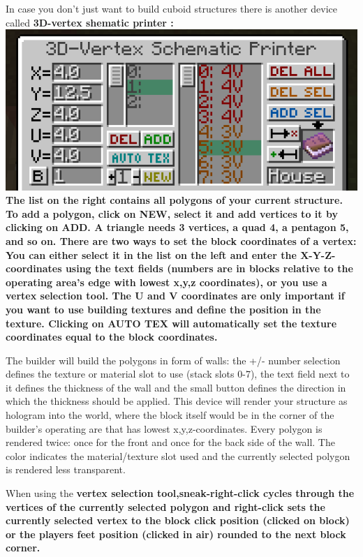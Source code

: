 \documentclass[11pt]{article} %
\begin{document}
In case you don't just want to build cuboid structures there is another device called \bf 3D-vertex shematic printer \rm :\\
\includegraphics[width = \textwidth]{vertexPrinter} \\
The list on the right contains all polygons of your current structure. To add a polygon, click on \bf NEW\rm, select it and add vertices to it by clicking on \bf ADD\rm . A triangle needs 3 vertices, a quad 4, a pentagon 5, and so on. There are two ways to set the block coordinates of a vertex: You can either select it in the list on the left and enter the X-Y-Z-coordinates using the text fields (numbers are in blocks relative to the operating area's edge with lowest x,y,z coordinates), or you use a \bf vertex selection tool\rm . The U and V coordinates are only important if you want to use building textures and define the position in the texture. Clicking on \bf AUTO TEX \rm will automatically set the texture coordinates equal to the block coordinates.

The builder will build the polygons in form of walls: the +/- number selection defines the texture or material slot to use (stack slots 0-7), the text field next to it defines the thickness of the wall and the small button defines the direction in which the thickness should be applied. This device will render your structure as hologram into the world, where the block itself would be in the corner of the builder's operating are that has lowest x,y,z-coordinates. Every polygon is rendered twice: once for the front and once for the back side of the wall. The color indicates the material/texture slot used and the currently selected polygon is rendered less transparent.

When using the \bf vertex selection tool\rm ,sneak-right-click cycles through the vertices of the currently selected polygon and right-click sets the currently selected vertex to the block click position (clicked on block) or the players feet position (clicked in air) rounded to the next block corner.
\end{document}
